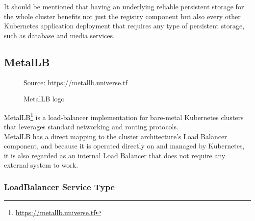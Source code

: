 It should be mentioned that having an underlying reliable persistent storage for
the whole cluster benefits not just the registry component but also every other
Kubernetes application deployment that requires any type of persistent storage, such
as database and media services.

\subsection{MetalLB}
\label{subsec:implementation_dependencies_metallb}

\begin{figure} %
  \centering
  \def\stackalignment{l} %
  {\scriptsize \parbox[t]{\linewidth}{ Source: \url{https://metallb.universe.tf}} }
  \caption{MetalLB logo}
\end{figure}

MetalLB\footnote{\url{https://metallb.universe.tf}} is a load-balancer implementation
for bare-metal Kubernetes clusters that leverages standard networking and routing
protocols. \\ %
MetalLB has a direct mapping to the cluster architecture's Load Balancer component,
and because it is operated directly on and managed by Kubernetes, it is also regarded
as an internal Load Balancer that does not require any external system to work.

\subsubsection{LoadBalancer Service Type}
\label{subsubsec:implementation_dependencies_metallb__loadbalancer_service_type}

